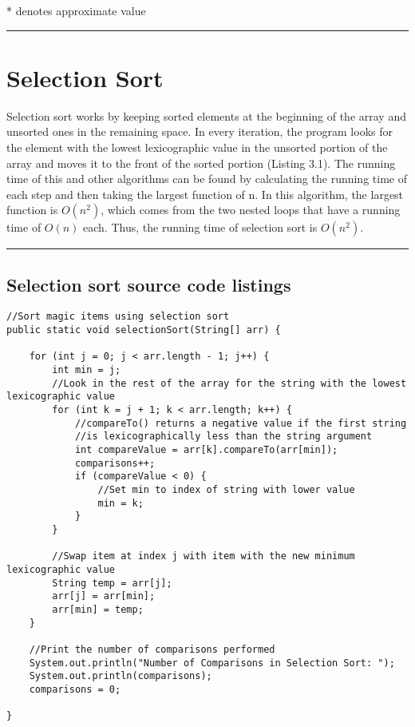 \documentclass[letterpaper, 10pt,DIV=13]{scrartcl}
\numberwithin{equation}{section} %
\numberwithin{figure}{section} %
\numberwithin{table}{section} %
\newcommand{\horrule}[1]{\rule{\linewidth}{#1}} %
\begin{document}
\begin{flushright} 
* denotes approximate value
\end{flushright}

\horrule{0pt}  	%

\section{Selection Sort}
Selection sort works by keeping sorted elements at the beginning of the array and unsorted ones in the remaining space. In every iteration, the program looks for the element with the lowest lexicographic value in the unsorted portion of the array and moves it to the front of the sorted portion (Listing 3.1). The running time of this and other algorithms can be found by calculating the running time of each step and then taking the largest function of n. In this algorithm, the largest function is $O(n^2)$, which comes from the two nested loops that have a running time of $O(n)$ each. Thus, the running time of selection sort is $O(n^2)$.

\horrule{0pt}  	%

\subsection{Selection sort source code listings}
\lstset{numbers=left, numberstyle=\tiny, stepnumber=1, numbersep=5pt, basicstyle=\footnotesize\ttfamily}
\begin{lstlisting}[frame=single, ] 
//Sort magic items using selection sort
public static void selectionSort(String[] arr) {

    for (int j = 0; j < arr.length - 1; j++) {
        int min = j;
        //Look in the rest of the array for the string with the lowest lexicographic value 
        for (int k = j + 1; k < arr.length; k++) {
            //compareTo() returns a negative value if the first string 
            //is lexicographically less than the string argument
            int compareValue = arr[k].compareTo(arr[min]);
            comparisons++;
            if (compareValue < 0) {
                //Set min to index of string with lower value
                min = k;  
            }
        }

        //Swap item at index j with item with the new minimum lexicographic value
        String temp = arr[j];
        arr[j] = arr[min];
        arr[min] = temp;
    }

    //Print the number of comparisons performed
    System.out.println("Number of Comparisons in Selection Sort: ");
    System.out.println(comparisons);
    comparisons = 0;

}
\end{lstlisting}
\end{document}
